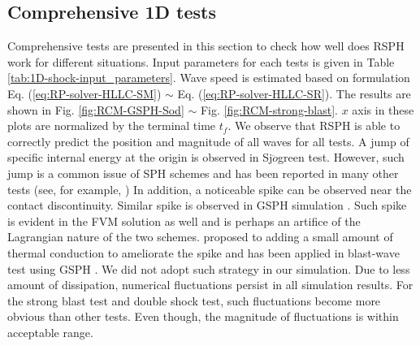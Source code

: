 \subsection{Comprehensive 1D tests} \label{sec:comprehensive-1d-tests}
Comprehensive tests are presented in this section to check how well does RSPH work for different situations. Input parameters for each tests is given in Table \ref{tab:1D-shock-input_parameters}. Wave speed is estimated based on formulation Eq. (\ref{eq:RP-solver-HLLC-SM}) $\sim$ Eq. (\ref{eq:RP-solver-HLLC-SR}).
The results are shown in Fig. \ref{fig:RCM-GSPH-Sod} $\sim$ Fig. \ref{fig:RCM-strong-blast}. $x$ axis in these plots are normalized by the terminal time $t_f$. We observe that RSPH is able to correctly predict the position and magnitude of all waves for all tests. A jump of specific internal energy at the origin is observed in Sj$\ddot{o}$green test. However, such jump is a common issue of SPH schemes and has been reported in many other tests (see, for example, \citep{monaghan1997sph,cha2003implementations,puri2014approximate})
In addition, a noticeable spike can be observed near the contact discontinuity. Similar spike is observed in GSPH simulation \citep{puri2014comparison}. Such spike is evident in the FVM solution as well and is perhaps an artifice of the Lagrangian nature of the two schemes. \citep{noh1987errors} proposed to adding a small amount of thermal conduction to ameliorate the spike and has been applied in blast-wave test using GSPH \citep{puri2014comparison}. We did not adopt such strategy in our simulation.
Due to less amount of dissipation, numerical fluctuations persist in all simulation results. For the strong blast test and double shock test, such fluctuations become more obvious than other tests. Even though, the magnitude of fluctuations is within acceptable range.

